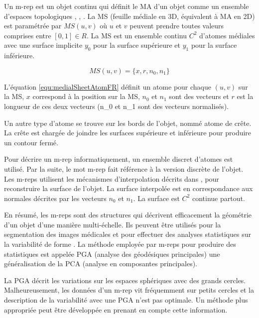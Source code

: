 Un m-rep est un objet continu qui définit le MA d'un objet comme
un ensemble d'espaces topologiques \cite{pizer1999segmentation}, \cite{yushkevich2003continuous}, \cite{pizer2003deformable}.
La MS (feuille médiale en 3D, équivalent à MA en 2D)
est paramétrée par $MS (u, v)$ où $u$ et $v$ peuvent prendre toutes valeurs comprises entre $[0, 1] \in R$.
La MS est un ensemble continu $C^2$ d'atomes médiales avec 
une surface implicite $y_{0}$ pour la surface supérieure et $y_{1}$ pour la surface inférieure.

\begin{equation}
MS (u, v) = \{x, r, n_0, n_1\}
\label{equ:medialSheetAtomFR}
\end{equation}

L'équation \ref{equ:medialSheetAtomFR} définit un atome pour chaque $(u, v)$ sur la MS,
$x$ correspond à la position sur la MS, $n_0$ et $n_1$
sont des vecteurs et $r$ est la longueur de ces deux vecteurs (n_0 et n_1 sont des vecteurs normalisés).


Un autre type d'atome se trouve sur les bords de l'objet, nommé atome de crête.
La crête est chargée de joindre les surfaces supérieure et inférieure
pour produire un contour fermé.

Pour décrire un m-rep informatiquement,
un ensemble discret d'atomes est utilisé.
Par la suite, le mot m-rep fait référence à la version discrète de l'objet.
Les m-reps utilisent les mécanismes d'interpolation décrits dans \cite{thall2004deformable},
pour reconstruire la surface de l'objet.
La surface interpolée est en correspondance
aux normales décrites par les vecteurs $n_0$ et $n_1$.
La surface est $C^2$ continue partout.

En résumé, les m-reps sont des structures 
qui décrivent efficacement la géométrie d'un objet d'une manière multi-échelle.
Ils peuvent être utilisés pour la segmentation des images médicales \cite{pizer2005method} 
et pour effectuer
des analyses statistiques sur la variabilité de forme \cite{fletcher2004principal}.
La méthode employée par m-reps pour produire des statistiques est appelée PGA (analyse des géodésiques principales)
une généralisation de la PCA (analyse en composantes principales).

La PGA décrit les variations sur les espaces sphériques avec des grands cercles.
Malheureusement, les données d'un m-rep vit fréquemment sur petits cercles
et la description de la variabilité avec une PGA n'est pas optimale.
Un méthode plus appropriée peut être développée en prenant en compte cette information.

